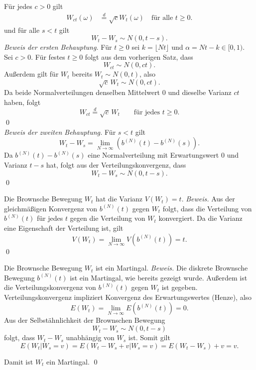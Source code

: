 \begin{lemma}
Für jedes $c > 0$ gilt
$$
\begin{aligned}
W_{ct}(\omega) &\stackrel{d}{=} \sqrt{c} W_t(\omega) \quad \text{für alle } t \ge 0.
\end{aligned}
$$
und für alle $s \lt t$ gilt
$$
W_t - W_s \sim N(0, t-s).
$$
\textit{Beweis der ersten Behauptung.}
Für $t \ge 0$ sei $k = \lfloor Nt \rfloor$ und $\alpha = Nt - k \in [0,1)$.
Sei $c>0$. Für festes $t\ge0$ folgt aus dem vorherigen Satz, dass
$$W_{ct}\sim N(0,ct).$$
Außerdem gilt für $W_t$ bereits $W_t\sim N(0,t)$, also
$$\sqrt{c}\,W_t\sim N(0,c t).$$
Da beide Normalverteilungen denselben Mittelwert $0$ und dieselbe Varianz $ct$ haben, folgt
$$W_{ct}\stackrel{d}{=}\sqrt{c}\,W_t\qquad\text{für jedes }t\ge0.$$
\qed \\
\textit{Beweis der zweiten Behauptung.}
Für $s < t$ gilt
$$
W_t - W_s = \lim_{N \to \infty} \left( b^{(N)}(t) - b^{(N)}(s) \right).
$$
Da $b^{(N)}(t) - b^{(N)}(s)$ eine Normalverteilung mit Erwartungswert $0$ und Varianz $t-s$ hat, folgt aus der Verteilungskonvergenz, dass
$$
W_t - W_s \sim N(0, t-s).
$$
\qed

\end{lemma}

\begin{satz}
Die Brownsche Bewegung $W_t$ hat die Varianz $V(W_t) = t$.
\textit{Beweis.}
Aus der gleichmäßigen Konvergenz von $b^{(N)}(t)$ gegen $W_t$ folgt, dass die Verteilung von $b^{(N)}(t)$ für jedes $t$ gegen die Verteilung von $W_t$ konvergiert. Da die Varianz eine Eigenschaft der Verteilung ist, gilt
$$
V(W_t) = \lim_{N \to \infty} V(b^{(N)}(t)) = t.
$$
\qed
\end{satz}

\begin{satz}
Die Brownsche Bewegung $W_t$ ist ein Martingal.
\textit{Beweis.}
Die diskrete Brownsche Bewegung $b^{(N)}(t)$ ist ein Martingal, wie bereits gezeigt wurde.
Außerdem ist die Verteilungskonvergenz von $b^{(N)}(t)$ gegen $W_t$ ist gegeben.
Verteilungskonvergenz impliziert Konvergenz des Erwartungswertes (Henze), also
$$
E(W_t) = \lim_{N \to \infty} E(b^{(N)}(t)) = 0.
$$
Aus der Selbstähnlichkeit der Brownschen Bewegung $$W_t - W_s \sim N(0, t-s)$$
folgt, dass $W_t - W_s$ unabhängig von $W_s$ ist. Somit gilt
$$
E(W_t | W_s = v) = E(W_t - W_s + v | W_s = v) = E(W_t - W_s) + v = v.
$$

Damit ist $W_t$ ein Martingal. \qed
\end{satz}